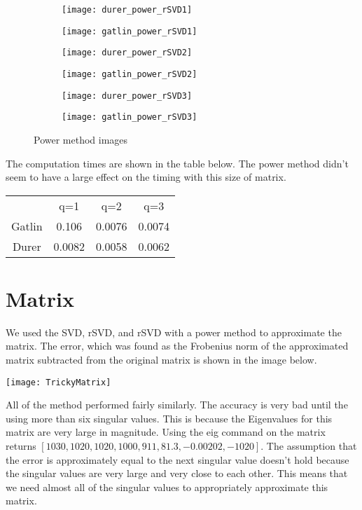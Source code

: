\documentclass{article}
\begin{document}
\begin{figure}[h!]

\begin{subfigure}{.5\textwidth}
  \centering
  \texttt{[image: durer\_power\_rSVD1]}
\end{subfigure}%
\begin{subfigure}{.5\textwidth}
  \centering
  \texttt{[image: gatlin\_power\_rSVD1]}
\end{subfigure}

\begin{subfigure}{.5\textwidth}
  \centering
  \texttt{[image: durer\_power\_rSVD2]}
\end{subfigure}%
\begin{subfigure}{.5\textwidth}
  \centering
  \texttt{[image: gatlin\_power\_rSVD2]}
\end{subfigure}

\begin{subfigure}{.5\textwidth}
  \centering
  \texttt{[image: durer\_power\_rSVD3]}
\end{subfigure}%
\begin{subfigure}{.5\textwidth}
  \centering
  \texttt{[image: gatlin\_power\_rSVD3]}
\end{subfigure}



\caption{Power method images}
\label{fig:power}
\end{figure}

The computation times are shown in the table below. The power method didn't seem to have a large effect on the timing with this size of matrix.
\begin{center}
\begin{tabular}{ c c c c }
 & q=1 & q=2 & q=3\\ 
Gatlin & 0.106 & 0.0076& 0.0074\\
Durer & 0.0082 & 0.0058 & 0.0062
\end{tabular}
\end{center}


\cleardoublepage


\section{Matrix}

We used the SVD, rSVD, and rSVD with a power method to approximate the matrix. The error, which was found as the Frobenius norm of the approximated matrix subtracted from the original matrix is shown in the image below.

  \texttt{[image: TrickyMatrix]}
  
All of the method performed fairly similarly. The accuracy is very bad until the using more than six singular values. This is because the Eigenvalues for this matrix are very large in magnitude. Using the eig command on the matrix returns $[1030,1020,1020,1000,911,81.3,-0.00202,-1020]$. The assumption that the error is approximately equal to the next singular value doesn't hold because the singular values are very large and very close to each other. This means that we need almost all of the singular values to appropriately approximate this matrix. 
\end{document}
